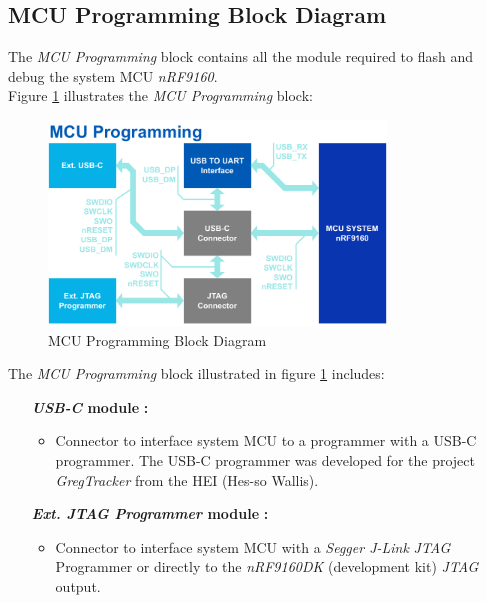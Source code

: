 \documentclass[report.tex]{subfiles}
\begin{document}
\pagebreak
\subsection{MCU Programming Block Diagram} \label{sec:mcu_blk_dgr}
The \textit{MCU Programming} block contains all the module required to flash and debug the system MCU \textit{nRF9160}.\\

Figure \ref{fig:mcu_programming_blk} illustrates the \textit{MCU Programming} block:

\begin{figure}[H]
	\centering
	\includegraphics[width=0.8\textwidth]{Include/Figure/Hardware/mcu_programming_blk.pdf}
	\caption{MCU Programming Block Diagram}
	\label{fig:mcu_programming_blk}
\end{figure}

The \textit{MCU Programming} block illustrated in figure \ref{fig:mcu_programming_blk} includes:
\begin{itemize}
\item [\quad\textbf{\textit{USB-C} module}]\textbf{:}
\begin{itemize}
\item Connector to interface system MCU to a programmer with a USB-C programmer. The USB-C programmer was developed for the project \textit{GregTracker} from the HEI (Hes-so Wallis).
\end{itemize} 
\item [\quad\textbf{\textit{Ext. JTAG Programmer} module}]\textbf{:}
\begin{itemize}
\item Connector to interface system MCU with a \textit{Segger J-Link} \textit{JTAG} Programmer or directly to the \textit{nRF9160DK} (development kit) \textit{JTAG} output.
\end{itemize}
\end{itemize}
\end{document}

